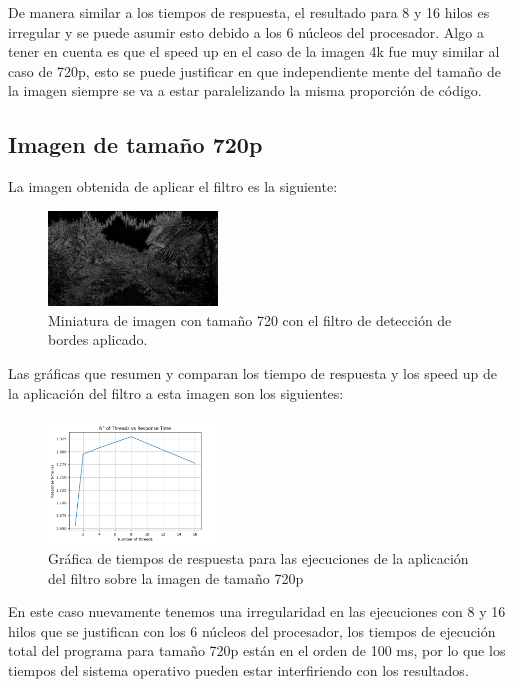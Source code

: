 De manera similar a los tiempos de respuesta, el resultado para 8 y 16 hilos es irregular y se puede asumir esto debido a los 6 núcleos del procesador. Algo a tener en cuenta es que el speed up en el caso de la imagen 4k fue muy similar al caso de 720p, esto se puede justificar en que independiente mente del tamaño de la imagen siempre se va a estar paralelizando la misma proporción de código.

\subsection{Imagen de tamaño 720p}

La imagen obtenida de aplicar el filtro es la siguiente:

\begin{figure}[H]
    \centering
    \includegraphics[width=0.4\textwidth]{../plots/720p.out.jpg}
    \caption{Miniatura de imagen con tamaño 720 con el filtro de detección de bordes aplicado.}
\end{figure}

Las gráficas que resumen y comparan los tiempo de respuesta y los speed up de la aplicación del filtro a esta imagen son los siguientes:

\begin{figure}[H]
    \centering
    \includegraphics[width=0.4\textwidth]{../plots/720p_response_time.png}
    \caption{Gráfica de tiempos de respuesta para las ejecuciones de la aplicación del filtro sobre la imagen de tamaño 720p}
\end{figure}

En este caso nuevamente tenemos una irregularidad en las ejecuciones con 8 y 16 hilos que se justifican con los 6 núcleos del procesador, los tiempos de ejecución total del programa para tamaño 720p están en el orden de 100 ms, por lo que los tiempos del sistema operativo pueden estar interfiriendo con los resultados.

